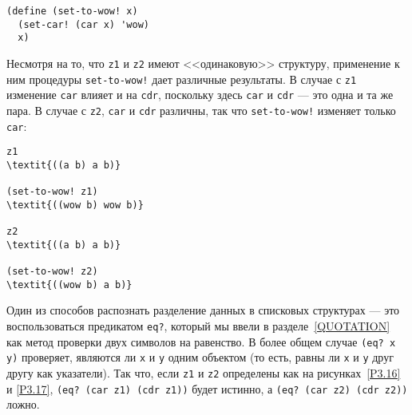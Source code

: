 \begin{Verbatim}[fontsize=\small]
(define (set-to-wow! x)
  (set-car! (car x) 'wow)
  x)
\end{Verbatim}
Несмотря на то, что {\tt z1} и {\tt z2} имеют
<<одинаковую>>  структуру, применение к ним процедуры
{\tt set-to-wow!} дает различные результаты.  В случае с
{\tt z1} изменение {\tt car} влияет и на
{\tt cdr}, поскольку здесь {\tt car} и {\tt cdr}
--- это одна и та же пара.  В случае с {\tt z2},
{\tt car} и {\tt cdr} различны, так что
{\tt set-to-wow!} изменяет только {\tt car}:

\begin{Verbatim}[fontsize=\small]
z1
\textit{((a b) a b)}

(set-to-wow! z1)
\textit{((wow b) wow b)}

z2
\textit{((a b) a b)}

(set-to-wow! z2)
\textit{((wow b) a b)}
\end{Verbatim}

Один из способов распознать разделение данных в списковых
структурах --- это воспользоваться предикатом {\tt eq?},
который мы ввели в разделе~\ref{QUOTATION} как метод
проверки двух символов на равенство.  В более общем случае
{\tt (eq? x y)}
проверяет, являются ли {\tt x} и
{\tt y} одним объектом (то есть, равны ли {\tt x} и
{\tt y} друг другу как указатели).  Так что, если
{\tt z1} и {\tt z2} определены как на
рисунках~\ref{P3.16} и \ref{P3.17},
{\tt (eq? (car z1) (cdr z1))} будет истинно, а
{\tt (eq? (car z2) (cdr z2))} ложно.

